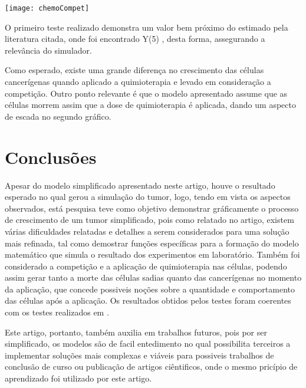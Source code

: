 \documentclass[12pt]{article}
\begin{document}
\texttt{[image: chemoCompet]}

O primeiro teste realizado demonstra um valor bem próximo do estimado pela literatura citada, onde foi encontrado Y(5) , desta forma, assegurando a relevância do simulador.

Como esperado, existe uma grande diferença no crescimento das células cancerígenas quando aplicado a quimioterapia e levado em consideração a competição. Outro ponto relevante é que o modelo apresentado assume que as células morrem assim que a dose de quimioterapia é aplicada, dando um aspecto de escada no segundo gráfico.

\section{Conclusões} \label{sec:conclusions}

Apesar do modelo simplificado apresentado neste artigo, houve o resultado esperado no qual gerou a simulação do tumor, logo, tendo em vista os aspectos observados, está pesquisa teve como objetivo demonstrar gráficamente o processo de crescimento de um tumor simplificado, pois como relatado no artigo, existem várias dificuldades relatadas e detalhes a serem considerados para uma solução mais refinada, tal como demostrar funções específicas para a formação do modelo matemático que simula o resultado dos experimentos em laboratório. Também foi considerado a competição e a aplicação de quimioterapia nas células, podendo assim gerar tanto a morte das células sadias quanto das cancerígenas no momento da aplicação, que concede possiveis noções sobre a quantidade e comportamento das células após a aplicação. Os resultados obtidos pelos testes foram coerentes com os testes realizados em \cite{Cornil1991}.


Este artigo, portanto, também auxilia em trabalhos futuros, pois por ser simplificado, os modelos são de facil entedimento no qual possibilita terceiros a implementar soluções mais complexas e viáveis para possiveis trabalhos de conclusão de curso ou publicação de artigos ciêntificos, onde o mesmo pricípio de aprendizado foi utilizado por este artigo.
\end{document}
